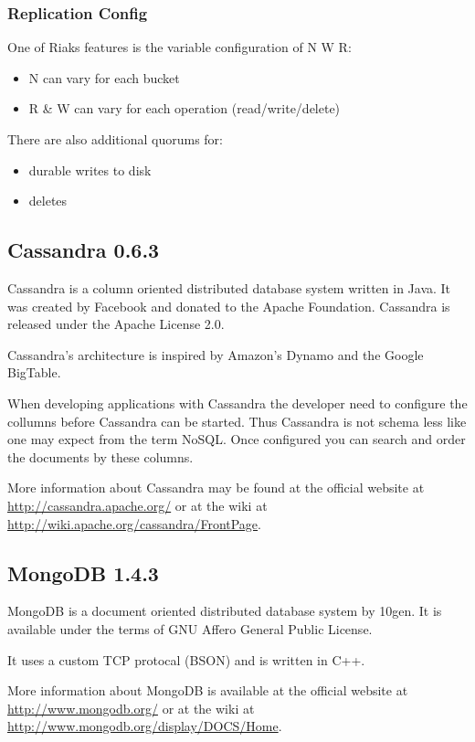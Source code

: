 \subsubsection{Replication Config}

One of Riaks features is the variable configuration of N W R:

\begin{itemize}
\item
  N can vary for each bucket
\item
  R \& W can vary for each operation (read/write/delete)
\end{itemize}
There are also additional quorums for:

\begin{itemize}
\item
  durable writes to disk
\item
  deletes
\end{itemize}
\subsection{Cassandra 0.6.3}

Cassandra is a column oriented distributed database system written
in Java. It was created by Facebook and donated to the Apache
Foundation. Cassandra is released under the Apache License 2.0.

Cassandra's architecture is inspired by Amazon's Dynamo and the
Google BigTable.

When developing applications with Cassandra the developer need to
configure the collumns before Cassandra can be started. Thus
Cassandra is not schema less like one may expect from the term
NoSQL. Once configured you can search and order the documents by
these columns.

More information about Cassandra may be found at the official
website at \url{http://cassandra.apache.org/} or at the wiki at
\url{http://wiki.apache.org/cassandra/FrontPage}.

\subsection{MongoDB 1.4.3}

MongoDB is a document oriented distributed database system by
10gen. It is available under the terms of GNU Affero General Public
License.

It uses a custom TCP protocal (BSON) and is written in C++.

More information about MongoDB is available at the official website
at \url{http://www.mongodb.org/} or at the wiki at
\url{http://www.mongodb.org/display/DOCS/Home}.

